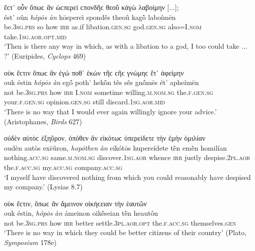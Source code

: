 \begin{exe}
\ex ἔϲτ᾽ οὖν ὅπωϲ ἂν ὡϲπερεὶ ϲπονδῆϲ θεοῦ κἀγὼ λαβοίμην {[}...{]};\\
\gll ést' oûn \emph{hópōs} \emph{àn} hōspereì spondês theoû kagṑ laboímēn\\
be.\textsc{3sg.prs} so how \textsc{irr} as.if libation.\textsc{gen.sg} god.\textsc{gen.sg} also=I.\textsc{nom} take.\textsc{1sg.aor.opt.mid}\\
\trans `Then is there any way in which, as with a libation to a god, I too could take ... ?' (Euripides, \textit{Cyclops} 469)
\label{relan28}
\end{exe}

\begin{exe}
\ex οὐκ ἔϲτιν ὅπωϲ ἂν ἐγώ ποθ᾽ ἑκὼν τῆϲ ϲῆϲ γνώμηϲ ἔτ᾽ ἀφείμην\\
\gll ouk éstin \emph{hópōs} \emph{àn} egṓ poth' hekṑn tês sês gnṓmēs ét' apheímēn\\
not be.\textsc{3sg.prs} how \textsc{irr} I.\textsc{nom} sometime willing.\textsc{m.nom.sg} the.\textsc{f.gen.sg} your.\textsc{f.gen.sg} opinion.\textsc{gen.sg} still discard.\textsc{1sg.aor.mid}\\
\trans `There is no way that I would ever again willingly ignore your advice.' (Aristophanes, \textit{Birds} 627)
\label{relan29}
\end{exe}

\begin{exe}
\ex οὐδὲν αὐτὸϲ ἐξηῦρον, ὁπόθεν ἂν εἰκότωϲ ὑπερείδετε τὴν ἐμὴν ὁμιλίαν\\
\gll oudèn autòs exēûron, \emph{hopóthen} \emph{àn} eikótōs hupereídete tḕn emḕn homilían\\
nothing.\textsc{acc.sg} same.\textsc{m.nom.sg} discover.\textsc{1sg.aor} whence \textsc{irr} justly despise.\textsc{2pl.aor} the.\textsc{f.acc.sg} my.\textsc{acc.sg} company.\textsc{acc.sg}\\
\trans `I myself have discovered nothing from which you could reasonably have despised my company.' (Lysias 8.7)
\label{relan30}
\end{exe}

\begin{exe}
\ex οὐκ ἔϲτιν, ὅπωϲ ἂν ἄμεινον οἰκήϲειαν τὴν ἑαυτῶν\\
\gll ouk éstin, \emph{hópōs} \emph{àn} ámeinon oikḗseian tḕn heautôn\\
not be.\textsc{3sg.prs} how \textsc{irr} better settle.\textsc{3pl.aor.opt} the.\textsc{f.acc.sg} themselves.\textsc{gen}\\
\trans `There is no way in which they could be better citizens of their country' (Plato, \textit{Symposium} 178e)
\label{relan31}
\end{exe}

